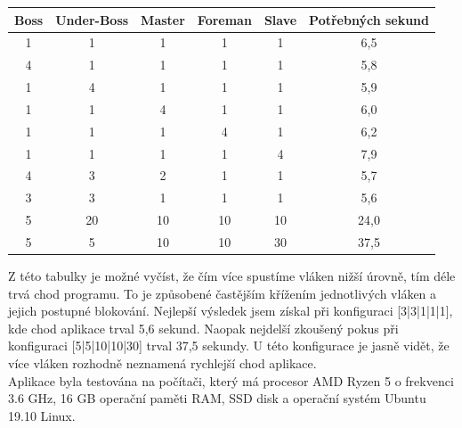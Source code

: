 \documentclass[ 12pt, a4paper]{article}
\begin{document}
\begin{center}
	\begin{tabular}{||c c c c c c||} 
		\hline
		Boss & Under-Boss & Master & Foreman & Slave & Potřebných sekund \\ [0.5ex] 
		\hline\hline
		1 & 1 & 1 & 1 & 1 & 6,5\\ [1ex]
		\hline
		4 & 1 & 1 & 1 & 1 & 5,8\\ [1ex]
		\hline
		1 & 4 & 1 & 1 & 1 & 5,9\\ [1ex]
		\hline
		1 & 1 & 4 & 1 & 1 & 6,0\\ [1ex]
		\hline
		1 & 1 & 1 & 4 & 1 & 6,2\\ [1ex]
		\hline
		1 & 1 & 1 & 1 & 4 & 7,9\\ [1ex]
		\hline
		4 & 3 & 2 & 1 & 1 & 5,7\\ [1ex]
		\hline
		3 & 3 & 1 & 1 & 1 & 5,6\\ [1ex]
		\hline
		5 & 20 & 10 & 10 & 10 & 24,0\\ [1ex]
		\hline
		5 & 5 & 10 & 10 & 30 & 37,5\\  [1ex] 
		\hline
	\end{tabular}
\end{center}

Z této tabulky je možné vyčíst, že čím více spustíme vláken nižší úrovně, tím déle trvá chod programu. To je způsobené častějším křížením jednotlivých vláken a jejich postupné blokování. Nejlepší výsledek jsem získal při konfiguraci [3|3|1|1|1], kde chod aplikace trval 5,6 sekund. Naopak nejdelší zkoušený pokus při konfiguraci [5|5|10|10|30] trval 37,5 sekundy. U této konfigurace je jasně vidět, že více vláken rozhodně neznamená rychlejší chod aplikace.\\


Aplikace byla testována na počítači, který má procesor AMD Ryzen 5 o frekvenci 3.6 GHz, 16 GB operační paměti RAM, SSD disk a operační systém Ubuntu 19.10 Linux.
\end{document}
